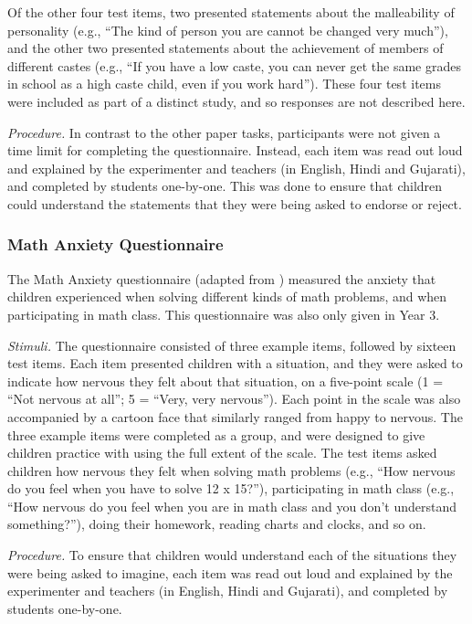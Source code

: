 \documentclass[11pt]{article}
\begin{document}
Of the other four test items, two presented statements about the malleability of personality (e.g., ``The kind of person you are cannot be changed very much''), and the other two presented statements about the achievement of members of different castes (e.g., ``If you have a low caste, you can never get the same grades in school as a high caste child, even if you work hard''). These four test items were included as part of a distinct study, and so responses are not described here.

{\it Procedure.} In contrast to the other paper tasks, participants were not given a time limit for completing the questionnaire. Instead, each item was read out loud and explained by the experimenter and teachers (in English, Hindi and Gujarati), and completed by students one-by-one. This was done to ensure that children could understand the statements that they were being asked to endorse or reject.

\subsubsection{Math Anxiety Questionnaire}

The Math Anxiety questionnaire (adapted from ) measured the anxiety that children experienced when solving different kinds of math problems, and when participating in math class. This questionnaire was also only given in Year 3.

{\it Stimuli.} The questionnaire consisted of three example items, followed by sixteen test items. Each item presented children with a situation, and they were asked to indicate how nervous they felt about that situation, on a five-point scale (1 = ``Not nervous at all''; 5 = ``Very, very nervous''). Each point in the scale was also accompanied by a cartoon face that similarly ranged from happy to nervous. The three example items were completed as a group, and were designed to give children practice with using the full extent of the scale. The test items asked children how nervous they felt when solving math problems (e.g., ``How nervous do you feel when you have to solve 12 x 15?''), participating in math class (e.g., ``How nervous do you feel when you are in math class and you don't understand something?''), doing their homework, reading charts and clocks, and so on.

{\it Procedure.} To ensure that children would understand each of the situations they were being asked to imagine, each item was read out loud and explained by the experimenter and teachers (in English, Hindi and Gujarati), and completed by students one-by-one.
\end{document}
